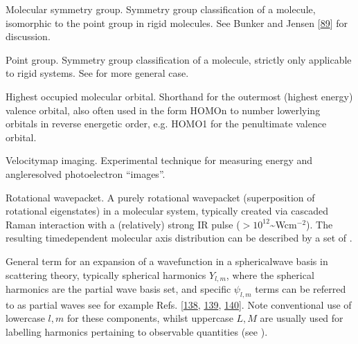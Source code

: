 \documentclass[letterpaper,table,10pt,english]{jupyterBook}
\begin{document}
\begin{description}
\sphinxAtStartPar
Molecular symmetry group. Symmetry group classification of a molecule, isomorphic to the point group in rigid molecules. See Bunker and Jensen {[}\hyperlink{cite.backmatter/bibliography:id546}{89}{]} for discussion.

\sphinxAtStartPar
Point group. Symmetry group classification of a molecule, strictly only applicable to rigid systems. See {\hyperref[\detokenize{backmatter/glossary:term-MS}]{}} for more general case.

\sphinxAtStartPar
Highest occupied molecular orbital. Short\sphinxhyphen{}hand for the outermost (highest energy) valence orbital, also often used in the form HOMO\sphinxhyphen{}n to number lower\sphinxhyphen{}lying orbitals in reverse energetic order, e.g. HOMO\sphinxhyphen{}1 for the penultimate valence orbital.

\sphinxAtStartPar
Velocity\sphinxhyphen{}map imaging. Experimental technique for measuring energy and angle\sphinxhyphen{}resolved photoelectron “images”.

\sphinxAtStartPar
Rotational wavepacket. A purely rotational wavepacket (superposition of rotational eigenstates) in a molecular system, typically created via cascaded Raman interaction with a (relatively) strong IR pulse (\(>10^{12}\)\textasciitilde{}Wcm\(^{-2}\)). The resulting time\sphinxhyphen{}dependent molecular axis distribution can be described by a set of {\hyperref[\detokenize{backmatter/glossary:term-ADMs}]{}}.

\sphinxAtStartPar
General term for an expansion of a wavefunction in a spherical\sphinxhyphen{}wave basis in scattering theory, typically spherical harmonics \(Y_{l,m}\), where the spherical harmonics are the partial wave basis set, and specific \(\psi_{l,m}\) terms can be referred to as partial waves \sphinxhyphen{} see for example Refs. {[}\hyperlink{cite.backmatter/bibliography:id738}{138}, \hyperlink{cite.backmatter/bibliography:id787}{139}, \hyperlink{cite.backmatter/bibliography:id865}{140}{]}. Note conventional use of lower\sphinxhyphen{}case \(l,m\) for these components, whilst upper\sphinxhyphen{}case \(L,M\) are usually used for labelling harmonics pertaining to observable quantities (see {\hyperref[\detokenize{backmatter/glossary:term-anisotropy-paramters}]{}}).


\end{description}
\end{document}
